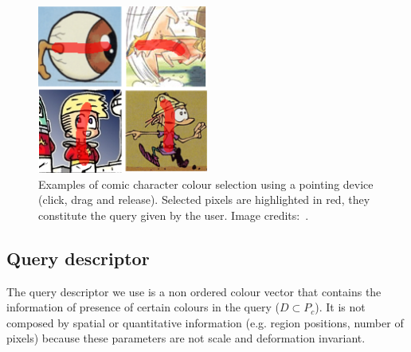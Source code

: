 \begin{figure}[!ht]	%
 	 \centering
 	\includegraphics[width=0.5\textwidth]{user_selection.png}
 	\caption[User defined comic character selection]{Examples of comic character colour selection using a pointing device (click, drag and release). Selected pixels are highlighted in red, they constitute the query given by the user. Image credits:~\cite{Noeils11,Bubble08,Midam01,Prunelle10}. }
 	\label{fig:in:user_selection}
 \end{figure}

\subsection{Query descriptor}

The query descriptor we use is a non ordered colour vector that contains the information of presence of certain colours in the query ($D \subset P_c$). It is not composed by spatial or quantitative information (e.g. region positions, number of pixels) because these parameters are not scale and deformation invariant.%


